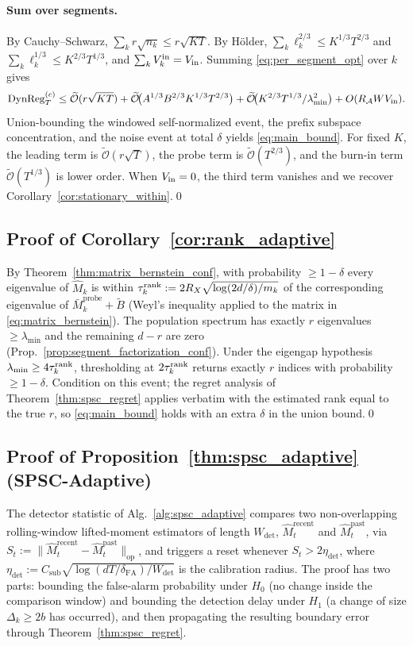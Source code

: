 \documentclass{article}
\newcommand{\op}{\mathrm{op}}
\newcommand{\cA}{\mathcal{A}}
\newcommand{\tilO}{\widetilde{\mathcal{O}}}
\newcommand{\DynReg}{\mathrm{DynReg}}
\begin{document}
\paragraph{Sum over segments.} By Cauchy--Schwarz,
$\sum_k r\sqrt{n_k}\le r\sqrt{KT}$. By H\"older,
$\sum_k\ell_k^{2/3}\le K^{1/3}T^{2/3}$ and
$\sum_k\ell_k^{1/3}\le K^{2/3}T^{1/3}$, and $\sum_k V_k^{\rm in}=V_{\rm in}$.
Summing \eqref{eq:per_segment_opt} over $k$ gives
\[
\DynReg_T^{(c)}
\le \tilO(r\sqrt{KT})
+ \tilO\!\bigl(A^{1/3}B^{2/3}K^{1/3}T^{2/3}\bigr)
+ \tilO\!\bigl(K^{2/3}T^{1/3}/\lambda_{\min}^2\bigr)
+ O(R_\cA W V_{\rm in}).
\]
Union-bounding the windowed self-normalized event, the prefix
subspace concentration, and the noise event at total $\delta$
yields \eqref{eq:main_bound}. For fixed $K$, the leading term is
$\tilO(r\sqrt T)$, the probe term is $\tilO(T^{2/3})$, and the
burn-in term $\tilO(T^{1/3})$ is lower order. When $V_{\rm in}=0$,
the third term vanishes and we recover
Corollary~\ref{cor:stationary_within}.\qed

\subsection{Proof of Corollary~\ref{cor:rank_adaptive}}
\label{app:proof_adaptive_rank}

By Theorem~\ref{thm:matrix_bernstein_conf}, with probability
$\ge 1-\delta$ every eigenvalue of $\widehat M_k$ is within
$\tau_k^{\rm rank} := 2R_X\sqrt{\log(2d/\delta)/m_k}$ of the
corresponding eigenvalue of $\bar M_k^{\mathrm{probe}} + \widetilde B$
(Weyl's inequality applied to the matrix in
\eqref{eq:matrix_bernstein}). The population spectrum has exactly $r$
eigenvalues $\ge\lambda_{\min}$ and the remaining $d-r$ are zero
(Prop.~\ref{prop:segment_factorization_conf}). Under the eigengap
hypothesis $\lambda_{\min}\ge 4\tau_k^{\rm rank}$, thresholding at
$2\tau_k^{\rm rank}$ returns exactly $r$ indices with probability
$\ge 1-\delta$. Condition
on this event; the regret analysis of Theorem~\ref{thm:spsc_regret}
applies verbatim with the estimated rank equal to the true $r$, so
\eqref{eq:main_bound} holds with an extra $\delta$ in the union bound.\qed

\subsection{Proof of Proposition~\ref{thm:spsc_adaptive} (SPSC-Adaptive)}
\label{app:proof_adaptive}

The detector statistic of Alg.~\ref{alg:spsc_adaptive} compares two
non-overlapping rolling-window lifted-moment estimators of length
$W_{\mathrm{det}}$,
$\widehat M_t^{\mathrm{recent}}$ and
$\widehat M_t^{\mathrm{past}}$, via
$S_t := \|\widehat M_t^{\mathrm{recent}}-\widehat M_t^{\mathrm{past}}\|_{\op}$,
and triggers a reset whenever $S_t>2\eta_{\mathrm{det}}$, where
$\eta_{\mathrm{det}} := C_{\mathrm{sub}}\sqrt{\log(dT/\delta_{\mathrm{FA}})/W_{\mathrm{det}}}$
is the calibration radius. The proof has two parts: bounding the
false-alarm probability under $H_0$ (no change inside the comparison
window) and bounding the detection delay under $H_1$ (a change of
size $\Delta_k\ge 2b$ has occurred), and then propagating the
resulting boundary error through Theorem~\ref{thm:spsc_regret}.
\end{document}

